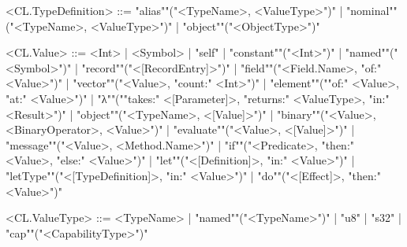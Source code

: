 \documentclass[main.tex]{subfiles}
\begin{document}
\begin{grammar}
				<CL.TypeDefinition> ::=
						"alias""("<TypeName>, <ValueType>")"
						| "nominal""("<TypeName>, <ValueType>")"
						| "object""("<ObjectType>")"
				\par
				<CL.Value> ::=
						<Int> |
								<Symbol> |
						"self"
						| "constant""("<Int>")"
						| "named""("<Symbol>")"
						| "record""("<[RecordEntry]>")"
						| "field""("<Field.Name>, "of:" <Value>")"
						| "vector""("<Value>, "count:" <Int>")"
						| "element""(""of:" <Value>, "at:" <Value>")"
						| "λ""(""takes:" <[Parameter]>, "returns:" <ValueType>, "in:" <Result>")"
						| "object""("<TypeName>, <[Value]>")"
						| "binary""("<Value>, <BinaryOperator>, <Value>")"
						| "evaluate""("<Value>, <[Value]>")"
						| "message""("<Value>, <Method.Name>")"
						| "if""("<Predicate>, "then:" <Value>, "else:" <Value>")"
						| "let""("<[Definition]>, "in:" <Value>")"
						| "letType""("<[TypeDefinition]>, "in:" <Value>")"
						| "do""("<[Effect]>, "then:" <Value>")"
				\par
				<CL.ValueType> ::=
								<TypeName> |
						"named""("<TypeName>")"
						| "u8"
						| "s32"
						| "cap""("<CapabilityType>")"
				\par
\end{grammar}
\par
\end{document}
